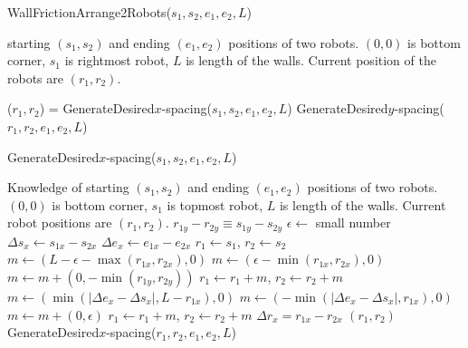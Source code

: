 \begin{algorithm}
\caption{WallFrictionArrange2Robots($s_1,s_2,e_1,e_2,L$)}\label{alg:PosControl2Robots}
\begin{algorithmic}[1]
\Require starting $(s_1,s_2)$ and ending $(e_1,e_2)$ positions of  two robots. 
$(0,0)$ is bottom corner, $s_1$ is rightmost robot, 
 $L$ is length of the walls. 
 Current position of the robots are $(r_1,r_2)$.

\State ($r_1,r_2$) = GenerateDesired$x$-spacing($s_1,s_2,e_1,e_2,L$)
\State GenerateDesired$y$-spacing($r_1,r_2,e_1,e_2,L$)

\end{algorithmic}
\end{algorithm}


\begin{algorithm}
\caption{GenerateDesired$x$-spacing($s_1,s_2,e_1,e_2,L$)}\label{alg:XControl}
\begin{algorithmic}[1]
\Require Knowledge of starting $(s_1,s_2)$ and ending $(e_1,e_2)$ positions of  two robots. 
$(0,0)$ is bottom corner, $s_1$ is topmost robot, 
 $L$ is length of the walls. Current robot positions are $(r_1,r_2)$.
\Ensure   $ r_{1y} - r_{2y}  \equiv s_{1y} - s_{2y} $   %
\State $\epsilon \gets $ small number
\State $ \Delta s_x  \gets s_{1x} - s_{2x} $
\State $ \Delta e_x \gets e_{1x} - e_{2x} $
\State $ r_1 \gets s_1$, $ r_2 \gets s_2$
\State $ m \gets ( L-\epsilon-\max( r_{1x},r_{2x}) ,0)   $ 
\Else 
\State  $ m \gets ( \epsilon-\min( r_{1x},r_{2x}),0 )    $ 
\EndIf
\State $m  \gets  m + (0, -\min( r_{1y},r_{2y} ))$ 
\State $ r_1 \gets r_1+m$, $ r_2 \gets r_2+m$ 
\State $ m \gets (\min(|\Delta e_x - \Delta s_x |, L- r_{1x}), 0)$  
\Else
\State $ m \gets (-\min(|\Delta e_x - \Delta s_x |, r_{1x}), 0)$
\EndIf 
\State $m  \gets  m + (0, \epsilon)$ 
\State $ r_1 \gets r_1+m$, $ r_2 \gets r_2+m$ 
\State $\Delta r_x = r_{1x} - r_{2x}$
\State  \Return $(r_1,r_2)$
\Else   
\State \Return GenerateDesired$x$-spacing($r_1,r_2,e_1,e_2,L$)
\EndIf
\end{algorithmic}
\end{algorithm}

